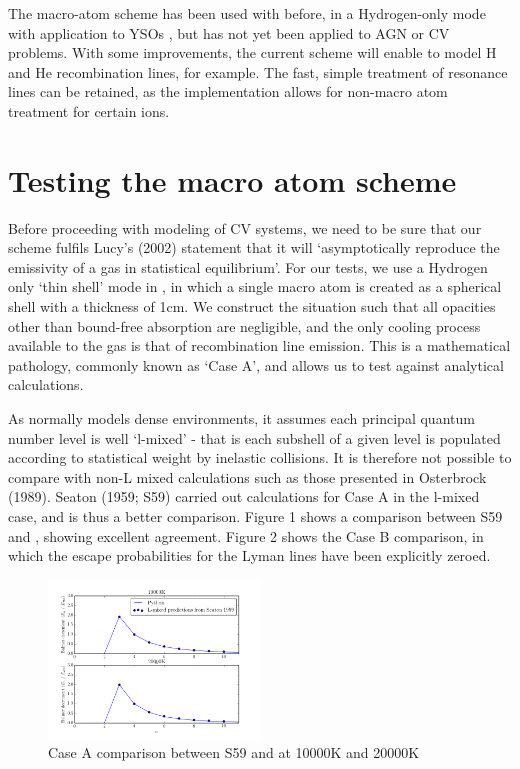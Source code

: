 \documentclass[usenatbib, a4paper]{mn2e}
\begin{document}
The macro-atom scheme has been used with \py before, in a Hydrogen-only mode with application to YSOs \citep{simmacro2005}, but has not yet been applied to AGN or CV problems. With some improvements, the current scheme will enable \py to model H and He recombination lines, for example. The fast, simple treatment of resonance lines 
can be retained, as the \py implementation allows for non-macro atom treatment for certain ions.




%
%

\section{Testing the macro atom scheme}

Before proceeding with modeling of CV systems, we need to be sure that our scheme fulfils Lucy's (2002) 
statement that it will `asymptotically reproduce the emissivity of a gas in statistical equilibrium'.
For our tests, we use a Hydrogen only `thin shell' mode in \py, in which a single macro atom is created as a spherical 
shell with a thickness of 1cm. We construct the situation such that all opacities other than 
bound-free absorption are negligible, and the only cooling process available to the gas is that of
recombination line emission. This is a mathematical pathology, commonly known as `Case A', and allows
us to test against analytical calculations.

As \py normally models dense environments, it assumes each principal quantum number level is
well `l-mixed' - that is each subshell of a given level is populated according to statistical weight by
inelastic collisions. It is therefore not possible to compare with non-L mixed calculations such as 
those presented in Osterbrock (1989\nocite{oster}). Seaton (1959; S59\nocite{seaton}) carried out calculations
for Case A in the l-mixed case, and is thus a better comparison. Figure 1 shows a comparison between S59
and \py, showing excellent agreement. Figure 2 shows the Case B comparison, in which the escape probabilities
for the Lyman lines have been explicitly zeroed.

\begin{figure}
\includegraphics[width=0.5\textwidth]{caseA.png}
\caption{Case A comparison between S59 and \py at 10000K and 20000K}
\end{figure}
\end{document}
